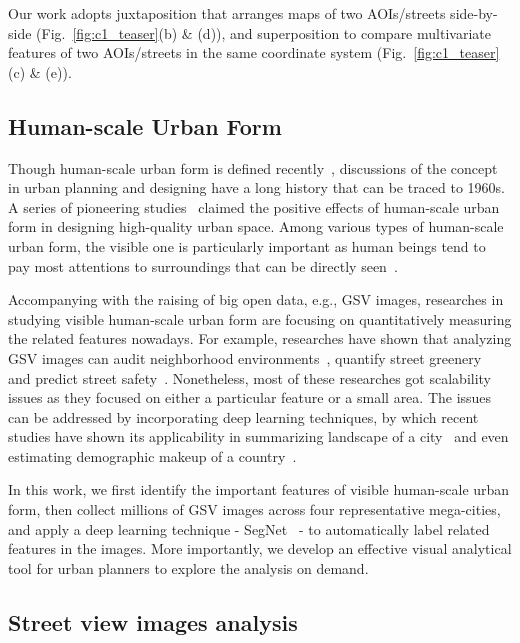 Our work adopts juxtaposition that arranges maps of two AOIs/streets side-by-side (Fig.~\ref{fig:c1_teaser}(b) \& (d)), and superposition to compare multivariate features of two AOIs/streets in the same coordinate system (Fig.~\ref{fig:c1_teaser}(c) \& (e)).

\subsection{Human-scale Urban Form}
Though human-scale urban form is defined recently~\cite{long_2016_human-scale}, discussions of the concept in urban planning and designing have a long history that can be traced to 1960s.
A series of pioneering studies~\cite{jacobs_1961_life, gehl_1971_life} claimed the positive effects of human-scale urban form in designing high-quality urban space.
Among various types of human-scale urban form, the visible one is particularly important as human beings tend to pay most attentions to surroundings that can be directly seen~\cite{gehl_1971_life}. 

Accompanying with the raising of big open data, e.g., GSV images, researches in studying visible human-scale urban form are focusing on quantitatively measuring the related features nowadays. 
For example, researches have shown that analyzing GSV images can audit neighborhood environments~\cite{rundle_2011_using}, quantify street greenery~\cite{li_2015_accessing} and predict street safety~\cite{Naik_2014_streetscore}.
Nonetheless, most of these researches got scalability issues as they focused on either a particular feature or a small area.
The issues can be addressed by incorporating deep learning techniques, by which recent studies have shown its applicability in summarizing landscape of a city~\cite{doersch2015makes} and even estimating demographic makeup of a country~\cite{gebru2017using}.

\vspace{2mm}
In this work, we first identify the important features of visible human-scale urban form, then collect millions of GSV images across four representative mega-cities, and apply a deep learning technique - SegNet~\cite{Badrinarayanan_2015_segnet} - to automatically label related features in the images.
More importantly, we develop an effective visual analytical tool for urban planners to explore the analysis on demand.

\fi

\subsection{Street view images analysis}

